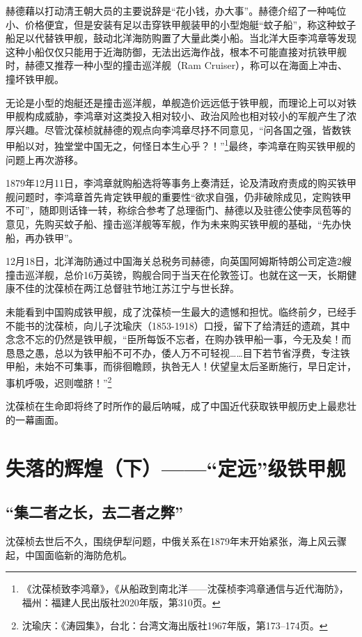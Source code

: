 \documentclass[12pt,UTF8]{ctexbook}
\begin{document}
赫德藉以打动清王朝大员的主要说辞是“花小钱，办大事”。赫德介绍了一种吨位小、价格便宜，但是安装有足以击穿铁甲舰装甲的小型炮艇“蚊子船”，称这种蚊子船足以代替铁甲舰，鼓动北洋海防购置了大量此类小船。当北洋大臣李鸿章等发现这种小船仅仅只能用于近海防御，无法出远海作战，根本不可能直接对抗铁甲舰时，赫德又推荐一种小型的撞击巡洋舰（Ram Cruiser），称可以在海面上冲击、撞坏铁甲舰。

无论是小型的炮艇还是撞击巡洋舰，单舰造价远远低于铁甲舰，而理论上可以对铁甲舰构成威胁，李鸿章对这类投入相对较小、政治风险也相对较小的军舰产生了浓厚兴趣。尽管沈葆桢就赫德的观点向李鸿章尽抒不同意见，“问各国之强，皆数铁甲船以对，独堂堂中国无之，何怪日本生心乎？！”\footnote{《沈葆桢致李鸿章》，《从船政到南北洋——沈葆桢李鸿章通信与近代海防》，福州：福建人民出版社2020年版，第310页。}最终，李鸿章在购买铁甲舰的问题上再次游移。

1879年12月11日，李鸿章就购船选将等事务上奏清廷，论及清政府责成的购买铁甲舰问题时，李鸿章首先肯定铁甲舰的重要性“欲求自强，仍非破除成见，定购铁甲不可”，随即则话锋一转，称综合参考了总理衙门、赫德以及驻德公使李凤苞等的意见，先购买蚊子船、撞击巡洋舰等军舰，作为未来购买铁甲舰的基础，“先办快船，再办铁甲”。

12月18日，北洋海防通过中国海关总税务司赫德，向英国阿姆斯特朗公司定造2艘撞击巡洋舰，总价16万英镑，购舰合同于当天在伦敦签订。也就在这一天，长期健康不佳的沈葆桢在两江总督驻节地江苏江宁与世长辞。

未能看到中国购成铁甲舰，成了沈葆桢一生最大的遗憾和担忧。临终前夕，已经手不能书的沈葆桢，向儿子沈瑜庆（1853-1918）口授，留下了给清廷的遗疏，其中念念不忘的仍然是铁甲舰，“臣所每饭不忘者，在购办铁甲船一事，今无及矣！而恳恳之愚，总以为铁甲船不可不办，倭人万不可轻视……目下若节省浮费，专注铁甲船，未始不可集事，而徘徊瞻顾，执咎无人！伏望皇太后圣断施行，早日定计，事机呼吸，迟则噬脐！”\footnote{沈瑜庆：《涛园集》，台北：台湾文海出版社1967年版，第173--174页。}

沈葆桢在生命即将终了时所作的最后呐喊，成了中国近代获取铁甲舰历史上最悲壮的一幕画面。

\chapter{失落的辉煌（下）——“定远”级铁甲舰}

\section{“集二者之长，去二者之弊”}

沈葆桢去世后不久，围绕伊犁问题，中俄关系在1879年末开始紧张，海上风云骤起，中国面临新的海防危机。
\end{document}

